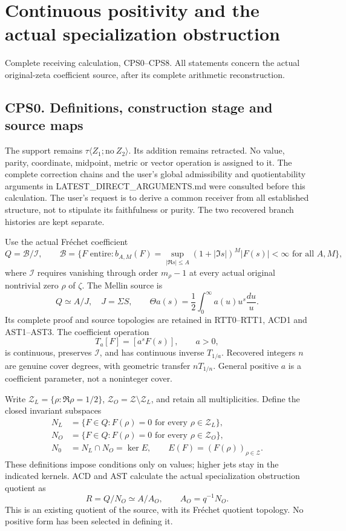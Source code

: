 \section{Continuous positivity and the actual specialization
obstruction}\label{continuous-positivity-and-the-actual-specialization-obstruction}

Complete receiving calculation, CPS0--CPS8. All statements concern the
actual original-zeta coefficient source, after its complete arithmetic
reconstruction.

\subsection{CPS0. Definitions, construction stage and source
maps}\label{cps0.-definitions-construction-stage-and-source-maps}

The support remains \(\tau\langle Z_1;\mathrm{no}\ Z_2\rangle\). Its
addition remains retracted. No value, parity, coordinate, midpoint,
metric or vector operation is assigned to it. The complete correction
chains and the user's global admissibility and quotientability arguments
in LATEST\_DIRECT\_ARGUMENTS.md were consulted before this calculation.
The user's request is to derive a common receiver from all established
structure, not to stipulate its faithfulness or purity. The two
recovered branch histories are kept separate.

Use the actual Fréchet coefficient \[
Q=\mathcal B/\mathcal I,\qquad
\mathcal B=\{F\text{ entire}:b_{A,M}(F)=
\sup_{|\Re s|\le A}(1+|\Im s|)^M|F(s)|<\infty
\text{ for all }A,M\},
\tag{CPS0.1}
\] where \(\mathcal I\) requires vanishing through order \(m_\rho-1\) at
every actual original nontrivial zero \(\rho\) of \(\zeta\). The Mellin
source is \[
Q\simeq A/J,\quad J=\Sigma S,\qquad
\Theta a(s)=\frac12\int_0^\infty a(u)u^s\frac{du}{u}.
\tag{CPS0.2}
\] Its complete proof and source topologies are retained in RTT0--RTT1,
ACD1 and AST1--AST3. The coefficient operation \[
T_a[F]=[a^sF(s)],\qquad a>0,
\tag{CPS0.3}
\] is continuous, preserves \(\mathcal I\), and has continuous inverse
\(T_{1/a}\). Recovered integers \(n\) are genuine cover degrees, with
geometric transfer \(nT_{1/n}\). General positive \(a\) is a coefficient
parameter, not a noninteger cover.

Write \(\mathscr Z_L=\{\rho:\Re\rho=1/2\}\),
\(\mathscr Z_O=\mathscr Z\setminus\mathscr Z_L\), and retain all
multiplicities. Define the closed invariant subspaces \[
\begin{split}
N_L&=\{F\in Q:F(\rho)=0\text{ for every }\rho\in\mathscr Z_L\},\\
N_O&=\{F\in Q:F(\rho)=0\text{ for every }\rho\in\mathscr Z_O\},\\
N_0&=N_L\cap N_O=\ker E,
\qquad E(F)=(F(\rho))_{\rho\in\mathscr Z}.
\end{split}
\tag{CPS0.4}
\] These definitions impose conditions only on values; higher jets stay
in the indicated kernels. ACD and AST calculate the actual
specialization obstruction quotient as \[
R=Q/N_O\simeq A/A_O,\qquad A_O=q^{-1}N_O.
\tag{CPS0.5}
\] This is an existing quotient of the source, with its Fréchet quotient
topology. No positive form has been selected in defining it.

